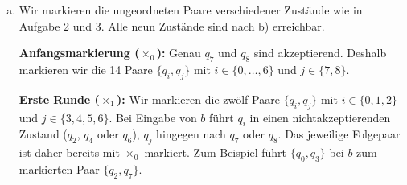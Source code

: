 \begin{loesung}
\begin{enumerate}[a)]
\newpage
\item Wir markieren die ungeordneten Paare verschiedener Zustände wie in
Aufgabe 2 und 3. Alle neun Zustände sind nach b) erreichbar.

\textbf{Anfangsmarkierung ($\times_0$):} Genau $q_7$ und $q_8$ sind
akzeptierend. Deshalb markieren wir die 14 Paare $\{q_i,q_j\}$ mit
$i\in\{0,\ldots,6\}$ und $j\in\{7,8\}$.

\textbf{Erste Runde ($\times_1$):} Wir markieren die zwölf Paare
$\{q_i,q_j\}$ mit $i\in\{0,1,2\}$ und $j\in\{3,4,5,6\}$.
Bei Eingabe von $b$ führt $q_i$ in einen nichtakzeptierenden Zustand
($q_2$, $q_4$ oder $q_6$), $q_j$ hingegen nach $q_7$ oder $q_8$.
Das jeweilige Folgepaar ist daher bereits mit $\times_0$ markiert.
Zum Beispiel führt $\{q_0,q_3\}$ bei $b$ zum markierten Paar $\{q_2,q_7\}$.


\end{enumerate}
\end{loesung}
